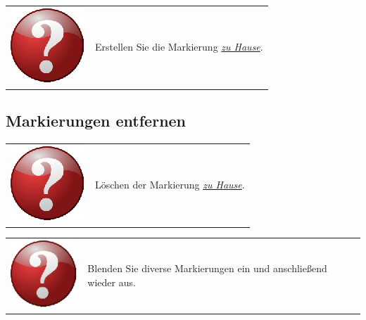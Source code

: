 \documentclass[10pt]{scrreprt}
\begin{document}
\vspace{3mm}
\begin{tabular}{>{\centering \arraybackslash}m{1cm} m{14cm}}
\includegraphics[scale=0.5]{images/quest.eps} & Erstellen Sie die Markierung \underline{\textit{zu Hause}}.
\end{tabular}



\vspace{3mm}
\subsection{Markierungen entfernen}  

\vspace{3mm}
\begin{tabular}{>{\centering \arraybackslash}m{1cm} m{14cm}}
\includegraphics[scale=0.5]{images/quest.eps} & Löschen der Markierung \underline{\textit{zu Hause}}.
\end{tabular}



\vspace{3mm}
\begin{tabular}{>{\centering \arraybackslash}m{1cm} m{14cm}}
\includegraphics[scale=0.5]{images/quest.eps} & Blenden Sie diverse Markierungen ein und anschließend wieder aus.
\end{tabular}





\vspace{3mm}
\end{document}
